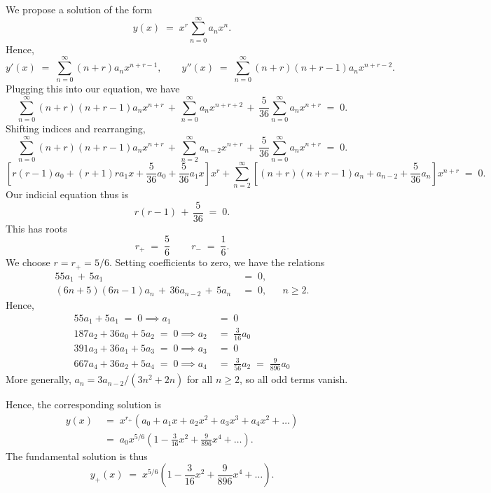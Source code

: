 \documentclass[10pt]{article}
\begin{document}
        We propose a solution of the form
        \[
        y(x) \;=\; x^r\sum_{n = 0}^\infty a_n x^n.
        \]
        Hence,
        \[
        y'(x) \;=\; \sum_{n = 0}^\infty (n + r) a_n x^{n  + r - 1}, \quad\quad y''(x) \;=\; \sum_{n = 0}^\infty (n + r)(n + r - 1)a_n x^{n + r - 2}.
        \]
        Plugging this into our equation, we have
        \[
        \sum_{n = 0}^{\infty}(n + r)(n + r - 1)a_n x^{n + r} \,+\, \sum_{n = 0}^\infty a_n x^{n + r + 2} \,+\,
        \frac{5}{36}\sum_{n = 0}^\infty a_n x^{n + r} \;=\; 0.
        \]
        Shifting indices and rearranging,
        \[
        \sum_{n = 0}^\infty (n + r)(n + r - 1)a_n x^{n + r} \,+\, \sum_{n = 2}^\infty a_{n - 2} x^{n + r} \,+\, \frac{5}{36}\sum_{n = 0}^\infty a_n x^{n + r} \;=\;0.
        \]
        \[
        \left[r(r-1)a_0 + (r+1)r a_1x + \frac{5}{36}a_0 + \frac{5}{36}a_1x\right]x^r + \sum_{n = 2}^\infty \left[ (n + r)(n + r - 1)a_n  + a_{n - 2} + \frac{5}{36}a_n \right] x^{n + r} \;=\;0.
        \]
        Our indicial equation thus is
        \[
        r(r-1) \,+\, \frac{5}{36} \;=\; 0.
        \]
        This has roots
        \[
        r_+ \;=\; \frac{5}{6}\, \quad\quad r_- \;=\; \frac{1}{6}.
        \]
        We choose $r = r_+ = 5 / 6$. Setting coefficients to zero, we have the relations
        \begin{align*}
                55a_1 \,+\, 5a_1 \;&=\; 0,       &&\\
                (6n + 5)(6n - 1)a_n \,+\, 36 a_{n-2} \,+\, 5a_n \;&=\; 0, &&n \geq 2.
        \end{align*}
        Hence,
        \begin{align*}
                55a_1 + 5a_1 \;=\; 0 \implies a_1 \;&=\; 0 \\
                187a_2 + 36a_0 + 5a_2 \;=\; 0 \implies a_2 \;&=\; \frac{3}{16}a_0\\
                391a_3 + 36a_1 + 5a_3 \;=\; 0 \implies a_3 \;&=\; 0\\
                667a_4 + 36a_2 + 5a_4 \;=\; 0 \implies a_4 \;&=\; \frac{3}{56}a_2 \;=\; \frac{9}{896}a_0
        \end{align*}
        More generally, $a_{n} = 3a_{n-2}/(3n^2 + 2n)$ for all $n \geq 2$, so all odd terms vanish.

        Hence, the corresponding solution is 
        \begin{align*}
                y(x) \;&=\; x^{r_+}(a_0 + a_1x + a_2x^2 + a_3 x^3 + a_4x^2 + \dots) \\
                        \;&=\; a_0 x^{5 /6}\left(1 - \frac{3}{16}x^2 + \frac{9}{896} x^4 + \dots\right).
        \end{align*}
        The fundamental solution is thus
        \[
                y_+(x) \;=\; x^{5 /6}\left(1 - \frac{3}{16}x^2 + \frac{9}{896} x^4 + \dots\right).
        \]
\end{document}
